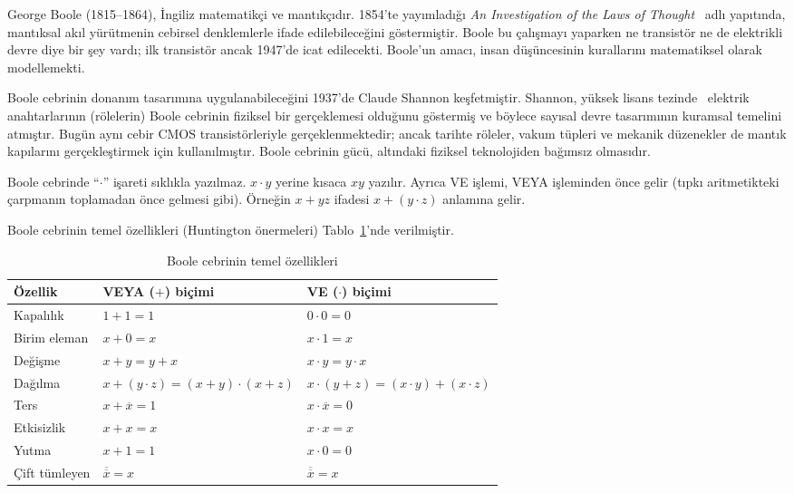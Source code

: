 \begin{bilginot}
George Boole (1815--1864), İngiliz matematikçi ve mantıkçıdır. 1854'te yayımladığı \emph{An Investigation of the Laws of Thought}~\cite{boole1854} adlı yapıtında, mantıksal akıl yürütmenin cebirsel denklemlerle ifade edilebileceğini göstermiştir. Boole bu çalışmayı yaparken ne transistör ne de elektrikli devre diye bir şey vardı; ilk transistör ancak 1947'de icat edilecekti. Boole'un amacı, insan düşüncesinin kurallarını matematiksel olarak modellemekti.

Boole cebrinin donanım tasarımına uygulanabileceğini 1937'de Claude Shannon keşfetmiştir. Shannon, yüksek lisans tezinde~\cite{shannon1937} elektrik anahtarlarının (rölelerin) Boole cebrinin fiziksel bir gerçeklemesi olduğunu göstermiş ve böylece sayısal devre tasarımının kuramsal temelini atmıştır. Bugün aynı cebir CMOS transistörleriyle gerçeklenmektedir; ancak tarihte röleler, vakum tüpleri ve mekanik düzenekler de mantık kapılarını gerçekleştirmek için kullanılmıştır. Boole cebrinin gücü, altındaki fiziksel teknolojiden bağımsız olmasıdır.
\end{bilginot}

\begin{bilginot}
Boole cebrinde ``$\cdot$'' işareti sıklıkla yazılmaz. $x \cdot y$ yerine kısaca $xy$ yazılır. Ayrıca VE işlemi, VEYA işleminden önce gelir (tıpkı aritmetikteki çarpmanın toplamadan önce gelmesi gibi). Örneğin $x + yz$ ifadesi $x + (y \cdot z)$ anlamına gelir.
\end{bilginot}

Boole cebrinin temel özellikleri (Huntington önermeleri) Tablo~\ref{tab:boole-ozellikleri}'nde verilmiştir.

\begin{table}[H]
\centering
\caption{Boole cebrinin temel özellikleri}
\label{tab:boole-ozellikleri}
\begin{tabular}{l l l}
\toprule
\textbf{Özellik} & \textbf{VEYA ($+$) biçimi} & \textbf{VE ($\cdot$) biçimi} \\
\midrule
Kapalılık      & $1 + 1 = 1$                          & $0 \cdot 0 = 0$ \\
Birim eleman   & $x + 0 = x$                          & $x \cdot 1 = x$ \\
Değişme        & $x + y = y + x$                      & $x \cdot y = y \cdot x$ \\
Dağılma        & $x + (y \cdot z) = (x+y) \cdot (x+z)$ & $x \cdot (y+z) = (x \cdot y) + (x \cdot z)$ \\
Ters           & $x + \overline{x} = 1$               & $x \cdot \overline{x} = 0$ \\
Etkisizlik     & $x + x = x$                          & $x \cdot x = x$ \\
Yutma          & $x + 1 = 1$                          & $x \cdot 0 = 0$ \\
Çift tümleyen  & $\overline{\overline{x}} = x$ & $\overline{\overline{x}} = x$ \\
\bottomrule
\end{tabular}
\end{table}

